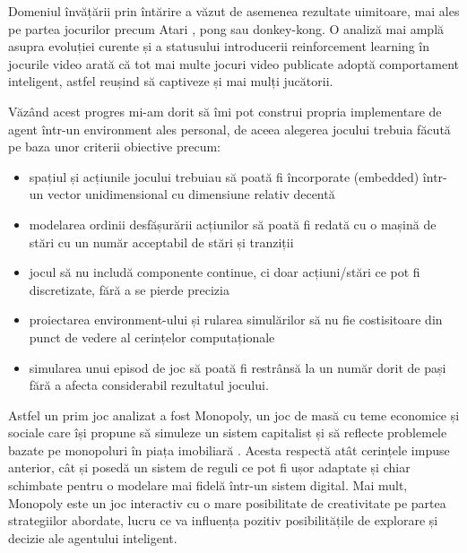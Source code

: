 Domeniul învățării prin întărire a văzut de asemenea rezultate uimitoare, mai ales pe partea jocurilor precum Atari \cite{atari}, pong sau donkey-kong. O analiză mai amplă asupra evoluției curente și a statusului introducerii reinforcement learning în jocurile video \cite{rl_in_video_games} arată că tot mai multe jocuri video publicate adoptă comportament inteligent, astfel reușind să captiveze și mai mulți jucătorii.

Văzând acest progres mi-am dorit să îmi pot construi propria implementare de agent într-un environment ales personal, de aceea alegerea jocului trebuia făcută pe baza unor criterii obiective precum:
\begin{itemize}
    \item spațiul și acțiunile jocului trebuiau să poată fi încorporate (embedded) într-un vector unidimensional cu dimensiune relativ decentă
    \item modelarea ordinii desfășurării acțiunilor să poată fi redată cu o mașină de stări cu un număr acceptabil de stări și tranziții
    \item jocul să nu includă componente continue, ci doar acțiuni/stări ce pot fi discretizate, fără a se pierde precizia
    \item proiectarea environment-ului și rularea simulărilor să nu fie costisitoare din punct de vedere al cerințelor computaționale
    \item simularea unui episod de joc să poată fi restrânsă la un număr dorit de pași fără a afecta considerabil rezultatul jocului.
\end{itemize}

Astfel un prim joc analizat a fost Monopoly, un joc de masă cu teme economice și sociale care își propune să simuleze un sistem capitalist și să reflecte problemele bazate pe monopoluri în piața imobiliară \cite{wikipedia_monopoly}. Acesta respectă atât cerințele impuse anterior, cât și posedă un sistem de reguli ce pot fi ușor adaptate și chiar schimbate pentru o modelare mai fidelă într-un sistem digital. Mai mult, Monopoly este un joc interactiv cu o mare posibilitate de creativitate pe partea strategiilor abordate, lucru ce va influența pozitiv posibilitățile de explorare și decizie ale agentului inteligent.

